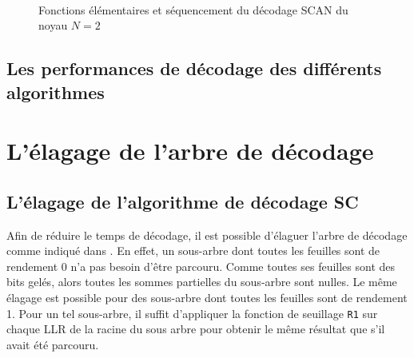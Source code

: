 \begin{figure}[t]
  \renewcommand*\thesubfigure{\arabic{subfigure}} 
  \centering
  \quad\quad\quad
  \\
  \quad\quad\quad
  \caption{Fonctions élémentaires et séquencement du décodage SCAN du noyau $N=2$}
  \label{fig:SCANSchedule}
\end{figure}

\subsection{Les performances de décodage des différents algorithmes}

\section{L'élagage de l'arbre de décodage}


\subsection{L'élagage de l'algorithme de décodage SC}
Afin de réduire le temps de décodage, il est possible d'élaguer l'arbre de décodage comme indiqué dans \cite{alamdar-yazdi_simplified_2011}. En effet, un sous-arbre dont toutes les feuilles sont de rendement 0 n'a pas besoin d'être parcouru. Comme toutes ses feuilles sont des bits gelés, alors toutes les sommes partielles du sous-arbre sont nulles. Le même élagage est possible pour des sous-arbre dont toutes les feuilles sont de rendement 1. Pour un tel sous-arbre, il suffit d'appliquer la fonction de seuillage \texttt{R1} sur chaque LLR de la racine du sous arbre pour obtenir le même résultat que s'il avait été parcouru.

